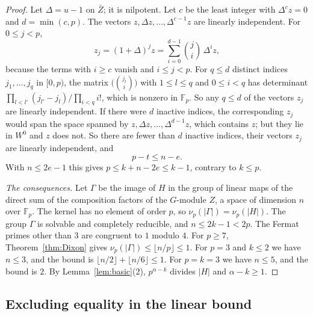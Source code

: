 \documentclass[11pt]{amsart}
\theoremstyle{definition}
\theoremstyle{remark}
\newcommand{\F}{\mathbb{F}}
\begin{document}
\begin{proof}
Let $\Delta=u-1$ on $\bar Z$; it is nilpotent. Let $c$ be the least integer with $\Delta^cz=0$ and $d=\min(c,p)$. The vectors $z,\Delta z,\dots,\Delta^{c-1}z$ are linearly independent. For $0\le j<p$,
\[
z_j=(1+\Delta)^jz=\sum_{i=0}^{d-1}\binom ji\,\Delta^iz ,
\]
because the terms with $i\ge c$ vanish and $i\le j<p$. For $q\le d$ distinct indices $j_1,\dots,j_q$ in $[0,p)$, the matrix $\bigl(\binom{j_l}{i}\bigr)$ with $1\le l\le q$ and $0\le i<q$ has determinant $\prod_{l<l'}(j_{l'}-j_l)/\prod_{i<q}i!$, which is nonzero in $\F_p$. So any $q\le d$ of the vectors $z_j$ are linearly independent. If there were $d$ inactive indices, the corresponding $z_j$ would span the space spanned by $z,\Delta z,\dots,\Delta^{d-1}z$, which contains $z$; but they lie in $W^0$ and $z$ does not. So there are fewer than $d$ inactive indices, their vectors $z_j$ are linearly independent, and
\[
p-t\le n-e .
\]
With $n\le2e-1$ this gives $p\le k+n-2e\le k-1$, contrary to $k\le p$.

\emph{The consequences.} Let $\Gamma$ be the image of $H$ in the group of linear maps of the direct sum of the composition factors of the $G$-module $Z$, a space of dimension $n$ over $\F_p$. The kernel has no element of order $p$, so $\nu_p(|\Gamma|)=\nu_p(|H|)$. The group $\Gamma$ is solvable and completely reducible, and $n\le2k-1<2p$. The Fermat primes other than $3$ are congruent to $1$ modulo $4$. For $p\ge7$, Theorem~\ref{thm:Dixon} gives $\nu_p(|\Gamma|)\le\lfloor n/p\rfloor\le1$. For $p=3$ and $k\le2$ we have $n\le3$, and the bound is $\lfloor n/2\rfloor+\lfloor n/6\rfloor\le1$. For $p=k=3$ we have $n\le5$, and the bound is $2$. By Lemma~\ref{lem:basic}(2), $p^{\alpha-k}$ divides $|H|$ and $\alpha-k\ge1$.
\end{proof}

\subsection{Excluding equality in the linear bound}
\end{document}
